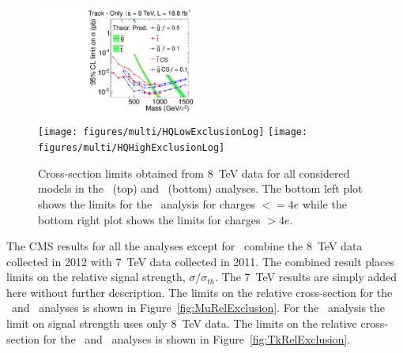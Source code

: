 \begin{figure}
\centering
  \includegraphics[clip=false, trim=0.0cm 0cm 0.0cm 0cm, width=0.48\textwidth]{figures/tkonly/TkExclusionLog} \\
  \texttt{[image: figures/multi/HQLowExclusionLog]}
  \texttt{[image: figures/multi/HQHighExclusionLog]}
\caption[Cross-section limits obtained from 8~TeV data for all considered models in the \tkonly\ and \multi\ analyses]
{Cross-section limits obtained from 8~TeV data for all considered models in the \tkonly\ (top) and \multi\ (bottom) analyses.
The bottom left plot shows the limits for the \multi\ analysis for charges $<= 4e$ while the bottom right plot shows the limits for charges $> 4e$.
}
    \label{fig:TkExclusion}
\end{figure}

The CMS results for all the analyses except for \muononly\ combine the 8~TeV data collected in 2012 with 7~TeV data collected in 2011.
The combined result places limits on
the relative signal strength, $\sigma/\sigma_{th}$. The 7~TeV results are simply added here without further description.
The limits on the relative cross-section
for the \muononly\ and \tktof\ analyses is shown in Figure~\ref{fig:MuRelExclusion}. For the \muononly\ analysis the limit on signal strength uses only 8~TeV data.
The limits on the relative cross-section for the \tkonly\ and \multi\ analyses is shown in Figure~\ref{fig:TkRelExclusion}.

